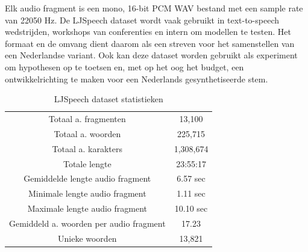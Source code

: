 Elk audio fragment is een mono, 16-bit PCM WAV bestand met een sample rate van 22050 Hz. De LJSpeech dataset wordt vaak gebruikt in text-to-speech wedstrijden, workshops van conferenties en intern om modellen te testen. Het formaat en de omvang dient daarom als een streven voor het samenstellen van een Nederlandse variant. Ook kan deze dataset worden gebruikt als experiment om hypothesen op te toetsen en, met op het oog het budget, een ontwikkelrichting te maken voor een Nederlands gesynthetiseerde stem.

\begin{table}[H]
    \centering
    \begin{tabular}{c|c}
    Totaal a. fragmenten & 13,100 \\
    Totaal a. woorden & 225,715 \\
    Totaal a. karakters & 1,308,674 \\
    Totale lengte & 23:55:17 \\
    Gemiddelde lengte audio fragment & 6.57 sec \\
    Minimale lengte audio fragment & 1.11 sec \\
    Maximale lengte audio fragment & 10.10 sec \\
    Gemiddeld a. woorden per audio fragment & 17.23 \\
    Unieke woorden & 13,821 \\
    \end{tabular}
    \caption{LJSpeech dataset statistieken}
    \label{tab:ljspeech}
\end{table}




